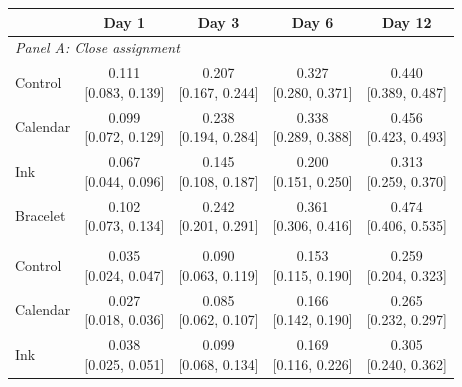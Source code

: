 \begin{tabular}{lcccc}
\toprule
 & Day 1 & Day 3 & Day 6 & Day 12 \\
\midrule
\multicolumn{5}{l}{\textit{Panel A: Close assignment}} \\
Control & \makecell[c]{0.111\\{[0.083, 0.139]}} & \makecell[c]{0.207\\{[0.167, 0.244]}} & \makecell[c]{0.327\\{[0.280, 0.371]}} & \makecell[c]{0.440\\{[0.389, 0.487]}} \\
Calendar & \makecell[c]{0.099\\{[0.072, 0.129]}} & \makecell[c]{0.238\\{[0.194, 0.284]}} & \makecell[c]{0.338\\{[0.289, 0.388]}} & \makecell[c]{0.456\\{[0.423, 0.493]}} \\
Ink & \makecell[c]{0.067\\{[0.044, 0.096]}} & \makecell[c]{0.145\\{[0.108, 0.187]}} & \makecell[c]{0.200\\{[0.151, 0.250]}} & \makecell[c]{0.313\\{[0.259, 0.370]}} \\
Bracelet & \makecell[c]{0.102\\{[0.073, 0.134]}} & \makecell[c]{0.242\\{[0.201, 0.291]}} & \makecell[c]{0.361\\{[0.306, 0.416]}} & \makecell[c]{0.474\\{[0.406, 0.535]}} \\
\addlinespace
\multicolumn{5}{l}{\textit{Panel B: Far assignment}} \\
Control & \makecell[c]{0.035\\{[0.024, 0.047]}} & \makecell[c]{0.090\\{[0.063, 0.119]}} & \makecell[c]{0.153\\{[0.115, 0.190]}} & \makecell[c]{0.259\\{[0.204, 0.323]}} \\
Calendar & \makecell[c]{0.027\\{[0.018, 0.036]}} & \makecell[c]{0.085\\{[0.062, 0.107]}} & \makecell[c]{0.166\\{[0.142, 0.190]}} & \makecell[c]{0.265\\{[0.232, 0.297]}} \\
Ink & \makecell[c]{0.038\\{[0.025, 0.051]}} & \makecell[c]{0.099\\{[0.068, 0.134]}} & \makecell[c]{0.169\\{[0.116, 0.226]}} & \makecell[c]{0.305\\{[0.240, 0.362]}} \\

\end{tabular}
